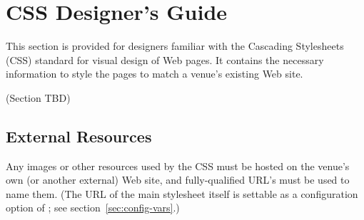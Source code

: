 
\section{CSS Designer's Guide}
\label{sec:creating_css}

This section is provided for designers familiar with the Cascading
Stylesheets (CSS) standard for visual design of Web pages.  It contains
the necessary information to style the \af pages to match a venue's
existing Web site.

(Section TBD)

\subsection{External Resources}

Any images or other resources used by the CSS must be  hosted on the
venue's own (or another external) Web site, and fully-qualified URL's
must be used to name them.  (The URL of the main stylesheet itself is
settable as a configuration option of \af; see
section~\ref{sec:config-vars}.) 
